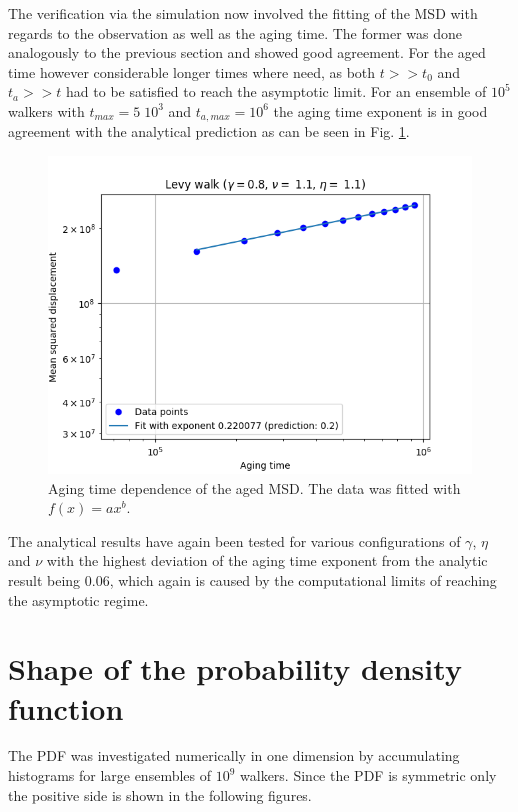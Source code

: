 The verification via the simulation now involved the fitting of the MSD with regards to the observation as well as the aging time. The former was done analogously to the previous section and showed good agreement. For the aged time however considerable longer times where need, as both $t>> t_0$ and $t_a>> t$ had to be satisfied to reach the asymptotic limit. For an ensemble of $10^5$ walkers with $t_{max}=5\; 10^{3}$ and $t_{a,max} = 10^{6}$ the aging time exponent is in good agreement with  the analytical prediction as can be seen in Fig. \ref{fig:plotMSDaged}.
%
\begin{figure}
\begin{center}
\includegraphics[width=120mm]{pics/plotMSDaged}
\caption{Aging time dependence of the aged MSD. The data was fitted with $f(x) = ax^b$.
\label{fig:plotMSDaged} }
\end{center}
\end{figure} 
%
The analytical results have again been tested for various configurations of $\gamma$, $\eta$ and $\nu$ with the highest deviation of the aging time exponent from the analytic result being 0.06, which again is caused by the computational limits of reaching the asymptotic regime.


\section{Shape of the probability density function}

The \gls{PDF} was investigated numerically in one dimension by accumulating histograms for large ensembles of $10^{9}$ walkers. Since the \gls{PDF} is symmetric only the positive side is shown in the following figures.\\

